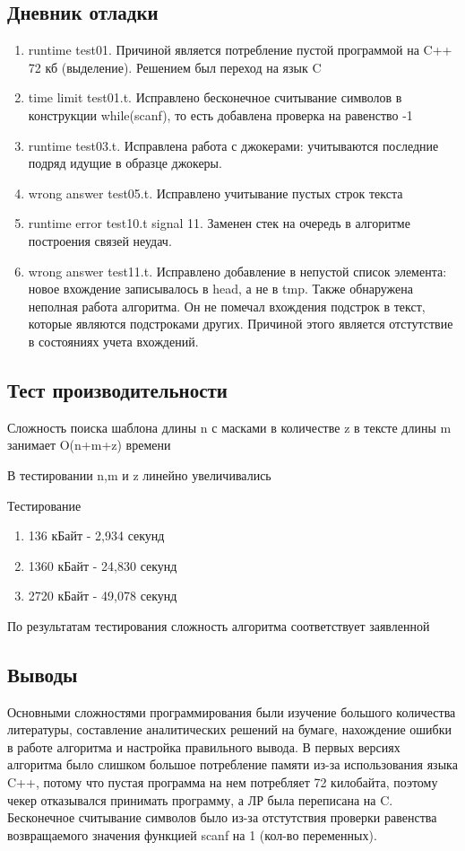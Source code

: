 \documentclass[12pt]{article}
\begin{document}
\subsection*{Дневник отладки}

\begin{enumerate}
\item runtime test01. Причиной является потребление пустой программой на C++ 72 кб (выделение). Решением был переход на язык C
\item time limit test01.t. Исправлено бесконечное считывание символов в конструкции while(scanf), то есть добавлена проверка на равенство -1
\item runtime test03.t. Исправлена работа с джокерами: учитываются последние подряд идущие в образце джокеры.
\item wrong answer test05.t. Исправлено учитывание пустых строк текста
\item runtime error test10.t signal 11. Заменен стек на очередь в алгоритме построения связей неудач.
\item wrong answer test11.t. Исправлено добавление в непустой список элемента: новое вхождение записывалось в head, а не в tmp. Также обнаружена неполная работа алгоритма. Он не помечал вхождения подстрок в текст, которые являются подстроками других. Причиной этого является отстутствие в состояниях учета вхождений.
\end{enumerate}

\subsection*{Тест производительности}

Сложность поиска шаблона длины n с масками в количестве z в тексте длины m занимает O(n+m+z) времени

В тестировании n,m и z линейно увеличивались

Тестирование
\begin{enumerate}
\item 136 кБайт - 2,934 секунд
\item 1360 кБайт - 24,830 секунд
\item 2720 кБайт - 49,078 секунд
\end{enumerate}

По результатам тестирования сложность алгоритма соответствует заявленной

\subsection*{Выводы}

Основными сложностями программирования были изучение большого количества литературы, составление аналитических решений на бумаге, нахождение ошибки в работе алгоритма и настройка правильного вывода. В первых версиях алгоритма было слишком большое потребление памяти из-за использования языка C++, потому что пустая программа на нем потребляет 72 килобайта, поэтому чекер отказывался принимать программу, а ЛР была переписана на C. Бесконечное считывание символов было из-за отстутствия проверки равенства возвращаемого значения функцией scanf на 1 (кол-во переменных). 
\end{document}
